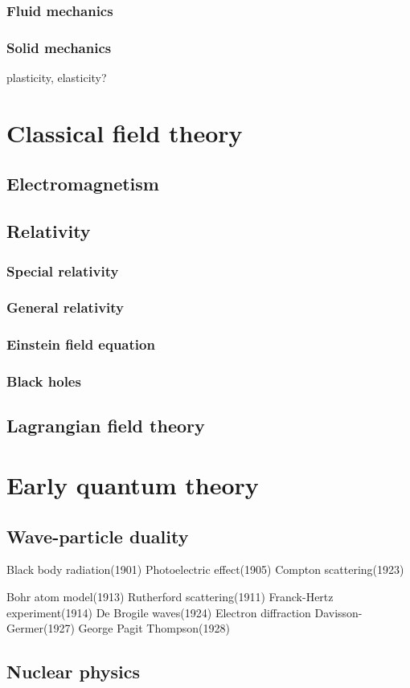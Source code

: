 \documentclass{../../large}
\begin{document}
\section{Fluid mechanics}
\section{Solid mechanics}
plasticity, elasticity?







\part{Classical field theory}
\chapter{Electromagnetism}

\chapter{Relativity}
\section{Special relativity}
\section{General relativity}
\section{Einstein field equation}
\section{Black holes}

\chapter{Lagrangian field theory}







\part{Early quantum theory}
\chapter{Wave-particle duality}
Black body radiation(1901)
Photoelectric effect(1905)
Compton scattering(1923)

Bohr atom model(1913)
	Rutherford scattering(1911)
	Franck-Hertz experiment(1914)
De Brogile waves(1924)
Electron diffraction
	Davisson-Germer(1927)
	George Pagit Thompson(1928)
\chapter{Nuclear physics}
\chapter{}
\end{document}
